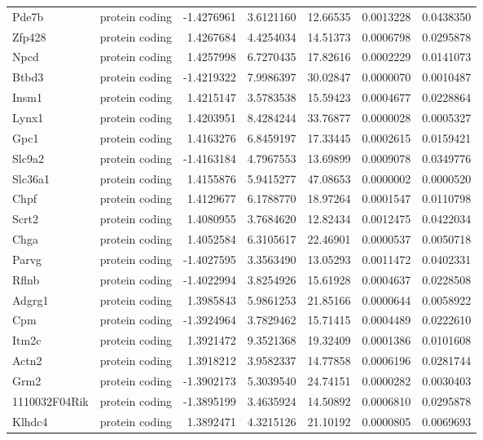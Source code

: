 \documentclass[onehalf,12pt]{beavtex}
\begin{document}
\begin{longtable}{llrrrrr}
  Pde7b & protein coding & -1.4276961 & 3.6121160 & 12.66535 & 0.0013228 & 0.0438350\\
  \addlinespace
  Zfp428 & protein coding & 1.4267684 & 4.4254034 & 14.51373 & 0.0006798 & 0.0295878\\
  Npcd & protein coding & 1.4257998 & 6.7270435 & 17.82616 & 0.0002229 & 0.0141073\\
  Btbd3 & protein coding & -1.4219322 & 7.9986397 & 30.02847 & 0.0000070 & 0.0010487\\
  Insm1 & protein coding & 1.4215147 & 3.5783538 & 15.59423 & 0.0004677 & 0.0228864\\
  Lynx1 & protein coding & 1.4203951 & 8.4284244 & 33.76877 & 0.0000028 & 0.0005327\\
  \addlinespace
  Gpc1 & protein coding & 1.4163276 & 6.8459197 & 17.33445 & 0.0002615 & 0.0159421\\
  Slc9a2 & protein coding & -1.4163184 & 4.7967553 & 13.69899 & 0.0009078 & 0.0349776\\
  Slc36a1 & protein coding & 1.4155876 & 5.9415277 & 47.08653 & 0.0000002 & 0.0000520\\
  Chpf & protein coding & 1.4129677 & 6.1788770 & 18.97264 & 0.0001547 & 0.0110798\\
  Scrt2 & protein coding & 1.4080955 & 3.7684620 & 12.82434 & 0.0012475 & 0.0422034\\
  \addlinespace
  Chga & protein coding & 1.4052584 & 6.3105617 & 22.46901 & 0.0000537 & 0.0050718\\
  Parvg & protein coding & -1.4027595 & 3.3563490 & 13.05293 & 0.0011472 & 0.0402331\\
  Rflnb & protein coding & -1.4022994 & 3.8254926 & 15.61928 & 0.0004637 & 0.0228508\\
  Adgrg1 & protein coding & 1.3985843 & 5.9861253 & 21.85166 & 0.0000644 & 0.0058922\\
  Cpm & protein coding & -1.3924964 & 3.7829462 & 15.71415 & 0.0004489 & 0.0222610\\
  \addlinespace
  Itm2c & protein coding & 1.3921472 & 9.3521368 & 19.32409 & 0.0001386 & 0.0101608\\
  Actn2 & protein coding & 1.3918212 & 3.9582337 & 14.77858 & 0.0006196 & 0.0281744\\
  Grm2 & protein coding & -1.3902173 & 5.3039540 & 24.74151 & 0.0000282 & 0.0030403\\
  1110032F04Rik & protein coding & -1.3895199 & 3.4635924 & 14.50892 & 0.0006810 & 0.0295878\\
  Klhdc4 & protein coding & 1.3892471 & 4.3215126 & 21.10192 & 0.0000805 & 0.0069693\\

\end{longtable}
\end{document}
